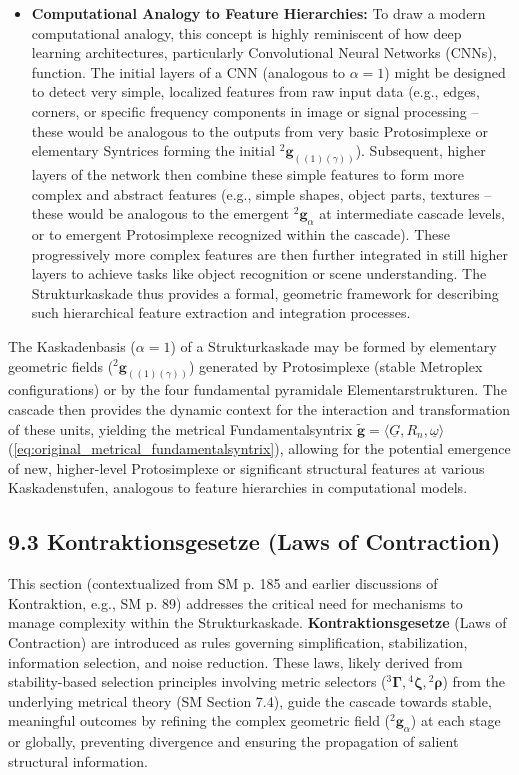 \documentclass[12pt]{article}
\newcommand{\kompositionsfeld}{{}^2\mathbf{g}}
\newcommand{\partialstruktur}[1]{{}^2\mathbf{g}_{(#1)}} %
\newcommand{\fundamentalkondensor}{{}^3\bm{\Gamma}}
\newcommand{\kaskadenstufe}{\alpha}
\newcommand{\strukturkompressor}{{}^4\bm{\zeta}}
\begin{document}
\begin{itemize}
    \item \textbf{Computational Analogy to Feature Hierarchies:}
    To draw a modern computational analogy, this concept is highly reminiscent of how deep learning architectures, particularly Convolutional Neural Networks (CNNs), function. The initial layers of a CNN (analogous to \( \kaskadenstufe=1 \)) might be designed to detect very simple, localized features from raw input data (e.g., edges, corners, or specific frequency components in image or signal processing – these would be analogous to the outputs from very basic Protosimplexe or elementary Syntrices forming the initial \( \partialstruktur{(1)(\gamma)} \)). Subsequent, higher layers of the network then combine these simple features to form more complex and abstract features (e.g., simple shapes, object parts, textures – these would be analogous to the emergent \( \kompositionsfeld_\alpha \) at intermediate cascade levels, or to emergent Protosimplexe recognized within the cascade). These progressively more complex features are then further integrated in still higher layers to achieve tasks like object recognition or scene understanding. The Strukturkaskade thus provides a formal, geometric framework for describing such hierarchical feature extraction and integration processes.
\end{itemize}

The Kaskadenbasis (\(\kaskadenstufe=1\)) of a Strukturkaskade may be formed by elementary geometric fields (\(\partialstruktur{(1)(\gamma)}\)) generated by Protosimplexe (stable Metroplex configurations) or by the four fundamental pyramidale Elementarstrukturen. The cascade then provides the dynamic context for the interaction and transformation of these units, yielding the metrical Fundamentalsyntrix $\tilde{\mathbf{g}} = \langle \underline{G}, R_n, \underline{\omega} \rangle$ (\eqref{eq:original_metrical_fundamentalsyntrix}), allowing for the potential emergence of new, higher-level Protosimplexe or significant structural features at various Kaskadenstufen, analogous to feature hierarchies in computational models.

\subsection{9.3 Kontraktionsgesetze (Laws of Contraction)}
\label{sec:kontraktionsgesetze}

This section (contextualized from SM p. 185 and earlier discussions of Kontraktion, e.g., SM p. 89) addresses the critical need for mechanisms to manage complexity within the Strukturkaskade. \textbf{Kontraktionsgesetze} (Laws of Contraction) are introduced as rules governing simplification, stabilization, information selection, and noise reduction. These laws, likely derived from stability-based selection principles involving metric selectors (\(\fundamentalkondensor, \strukturkompressor, {}^2\bm{\rho}\)) from the underlying metrical theory (SM Section 7.4), guide the cascade towards stable, meaningful outcomes by refining the complex geometric field (\(\kompositionsfeld_\alpha\)) at each stage or globally, preventing divergence and ensuring the propagation of salient structural information.
\end{document}
